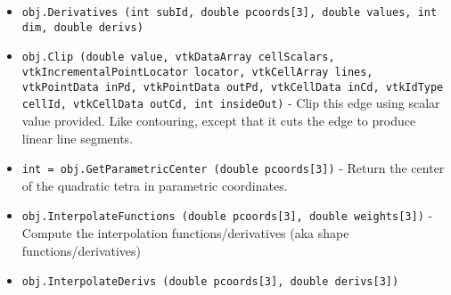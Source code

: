 \begin{itemize}
\item  \verb|obj.Derivatives (int subId, double pcoords[3], double values, int dim, double derivs)|

\item  \verb|obj.Clip (double value, vtkDataArray cellScalars, vtkIncrementalPointLocator locator, vtkCellArray lines, vtkPointData inPd, vtkPointData outPd, vtkCellData inCd, vtkIdType cellId, vtkCellData outCd, int insideOut)| -  Clip this edge using scalar value provided. Like contouring, except
 that it cuts the edge to produce linear line segments.

\item  \verb|int = obj.GetParametricCenter (double pcoords[3])| -  Return the center of the quadratic tetra in parametric coordinates.

\item  \verb|obj.InterpolateFunctions (double pcoords[3], double weights[3])| -  Compute the interpolation functions/derivatives
 (aka shape functions/derivatives)

\item  \verb|obj.InterpolateDerivs (double pcoords[3], double derivs[3])|

\end{itemize}
